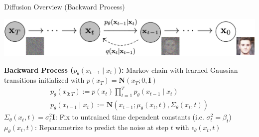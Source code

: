 \documentclass{beamer}
\begin{document}
\begin{frame}{Diffusion Overview (Backward Process)}
    \begin{center}
        \includegraphics[width=.9\textwidth]{./img/img_diffusion.png}
    \end{center}
    \textbf{Backward Process ($p_\theta(x_{t-1} \mid x_{t})$):} Markov chain with learned Gaussian \\ \hspace{1em} transitions initialized with $p(x_T) = \mathbf{N}(x_T; 0, \mathbf{I})$
    \begin{gather}
    p_{\theta}(x_{0:T}) := p(x_t)\prod_{t=1}^{T} p_{\theta}(x_{t-1} \mid x_{t})
    \\
    p_\theta(x_{t-1} \mid x_t):= \mathbf{N}(x_{t-1}; \mu_\theta(x_t, t), \Sigma_\theta(x_t,t))
    \end{gather}
    \newline
    $\Sigma_\theta(x_t,t) = \sigma_t^2 \mathbf{I}$: Fix to untrained time dependent constants (i.e. $\sigma_t^2 = \beta_t$)\newline \newline
    $\mu_\theta(x_t,t)$: Reparametrize to predict the noise at step $t$ with $\epsilon_\theta (x_t, t)$ \newline \newline \pause
\end{frame}
\end{document}
